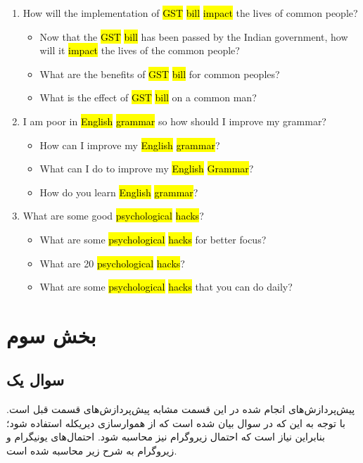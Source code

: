 \documentclass[12pt, a4paper]{book}
\begin{document}
\begin{latin}
    \begin{enumerate}
        \item How will the implementation of \hl{GST} \hl{bill} \hl{impact} the lives of common people?
        \begin{itemize}
            \item Now that the \hl{GST} \hl{bill} has been passed by the Indian government, how will it \hl{impact} the lives of the common people?
            \item What are the benefits of \hl{GST} \hl{bill} for common peoples?
            \item What is the effect of \hl{GST} \hl{bill} on a common man?
        \end{itemize}
        \item I am poor in \hl{English} \hl{grammar} so how should I improve my grammar?
        \begin{itemize}
            \item How can I improve my \hl{English} \hl{grammar}?
            \item What can I do to improve my \hl{English} \hl{Grammar}?
            \item How do you learn \hl{English} \hl{grammar}?
        \end{itemize}
        \item What are some good \hl{psychological} \hl{hacks}?
        \begin{itemize}
            \item What are some \hl{psychological} \hl{hacks} for better focus?
            \item What are 20 \hl{psychological} \hl{hacks}?
            \item What are some \hl{psychological} \hl{hacks} that you can do daily?
        \end{itemize}
    \end{enumerate}
\end{latin}

\section*{بخش سوم}

\subsection*{سوال یک}

پیش‌پردازش‌های انجام شده در این قسمت مشابه پیش‌پردازش‌های قسمت قبل است.
با توجه به این که در سوال بیان شده است که از هموار‌سازی دیریکله استفاده شود؛ بنابراین نیاز است که
احتمال زیروگرام نیز محاسبه شود. احتمال‌های یونیگرام و
زیروگرام به شرح زیر محاسبه شده است.
\end{document}
